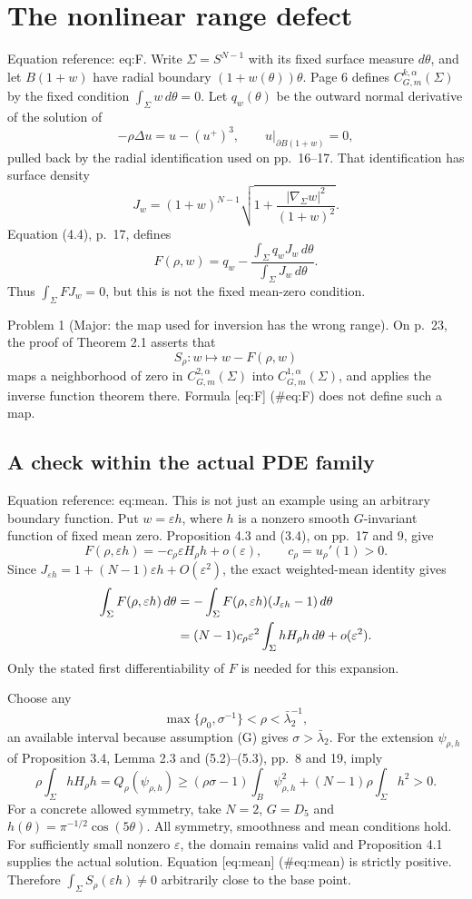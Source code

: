 \documentclass[10pt]{article}
\begin{document}
\section*{The nonlinear range defect}
Equation reference: eq:F. Write \(\Sigma=S^{N-1}\) with its fixed surface measure \(d\theta\), and let \(B(1+w)\) have radial boundary \((1+w(\theta))\theta\). Page 6 defines \(C^{k,\alpha}_{G,m}(\Sigma)\) by the fixed condition \(\int_\Sigma w\,d\theta=0\). Let \(q_w(\theta)\) be the outward normal derivative of the solution of \[-\rho\Delta u=u-(u^+)^3,\qquad u|_{\partial B(1+w)}=0,\] pulled back by the radial identification used on pp. 16–17. That identification has surface density \[J_w=(1+w)^{N-1}
 \sqrt{1+\frac{|\nabla_\Sigma w|^2}{(1+w)^2}}.\] Equation (4.4), p. 17, defines \[
F(\rho,w)=q_w-\frac{\int_\Sigma q_wJ_w\,d\theta}{\int_\Sigma J_w\,d\theta}.\] Thus \(\int_\Sigma FJ_w=0\), but this is not the fixed mean-zero condition.\par
Problem 1 (Major: the map used for inversion has the wrong range).  On p. 23, the proof of Theorem 2.1 asserts that \[S_\rho:w\longmapsto w-F(\rho,w)\] maps a neighborhood of zero in \(C^{2,\alpha}_{G,m}(\Sigma)\) into \(C^{1,\alpha}_{G,m}(\Sigma)\), and applies the inverse function theorem there. Formula [eq:F] (\#eq:F) does not define such a map.\par
\subsection*{A check within the actual PDE family}
Equation reference: eq:mean. This is not just an example using an arbitrary boundary function. Put \(w=\varepsilon h\), where \(h\) is a nonzero smooth \(G\)-invariant function of fixed mean zero. Proposition 4.3 and (3.4), on pp. 17 and 9, give \[F(\rho,\varepsilon h)=-c_\rho\varepsilon H_\rho h+o(\varepsilon),
 \qquad c_\rho=u_\rho'(1)>0.\] Since \(J_{\varepsilon h}=1+(N-1)\varepsilon h+O(\varepsilon^2)\), the exact weighted-mean identity gives \[\begin{aligned}
\int_\Sigma F(\rho,\varepsilon h)\,d\theta
&=-\int_\Sigma F(\rho,\varepsilon h)(J_{\varepsilon h}-1)\,d\theta \notag\\
&=(N-1)c_\rho\varepsilon^2
       \int_\Sigma hH_\rho h\,d\theta+o(\varepsilon^2).
\end{aligned}\] Only the stated first differentiability of \(F\) is needed for this expansion.\par
Choose any \[\max\{\rho_0,\sigma^{-1}\}<\rho<\bar\lambda_2^{-1},\] an available interval because assumption (G) gives \(\sigma>\bar\lambda_2\). For the extension \(\psi_{\rho,h}\) of Proposition 3.4, Lemma 2.3 and (5.2)–(5.3), pp. 8 and 19, imply \[\rho\int_\Sigma hH_\rho h
 =Q_\rho(\psi_{\rho,h})
 \geq(\rho\sigma-1)\int_B\psi_{\rho,h}^2
       +(N-1)\rho\int_\Sigma h^2>0.\] For a concrete allowed symmetry, take \(N=2\), \(G=D_5\) and \(h(\theta)=\pi^{-1/2}\cos(5\theta)\). All symmetry, smoothness and mean conditions hold. For sufficiently small nonzero \(\varepsilon\), the domain remains valid and Proposition 4.1 supplies the actual solution. Equation [eq:mean] (\#eq:mean) is strictly positive. Therefore \(\int_\Sigma S_\rho(\varepsilon h)\neq0\) arbitrarily close to the base point.\par
\end{document}
